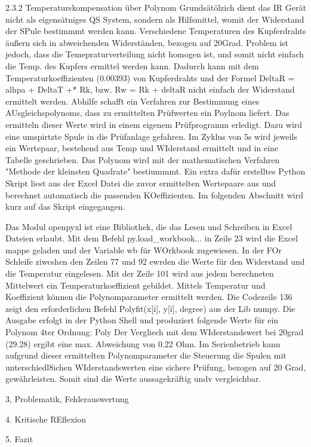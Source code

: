 	2.3.2 Temperaturskompensation über Polynom
		Grundsätölzich dient das IR Gerät nicht als eigensätniges QS System, sondern als 
		Hilfsmittel, womit der Widerstand der SPule bestimmmt werden kann. Verschiedene Temperaturen des Kupferdrahts 
		äußern sich in abweichenden Widerständen, bezogen auf 20Grad. Problem ist jedoch, dass die Temepraturverteilung nicht
		homogen ist, und somit nicht einfach die Temp. des Kupfers ermittel werden kann. Dadurch kann mit dem Temperaturkoeffizienten (0.00393) von Kupferdrahts
		und der Formel DeltaR = alhpa + DeltaT +* Rk, bzw. Rw = Rk + deltaR nicht einfach der Widerstand ermittelt werden. 
		Abhilfe schafft ein Verfahren zur Bestimmung eines AUsgleichspolynoms, dass zu ermittelten Prüfwerten
		ein Poylnom liefert. Das ermitteln dieser Werte wird in einem eigenem Prüfprogramm erledigt. Dazu wird eine umspirtzte Spule in die Prüfanlage gefahren.
		Im Zyklus von 5s wird jeweils ein Wertepaar, bestehend aus Temp und WIderstand ermittelt und in eine Tabelle geschrieben.
		Das Polynom wird mit der mathematischen Verfahren "Methode der kleinsten Quadrate" bestiummmt.
		Ein extra dafür erstelltes Python Skript liest aus der Excel Datei die zuvor ermittelten Wertepaare aus und 
		berechnet automatisch die passenden KOeffizienten. Im folgenden Abschnitt wird kurz auf das Skript eingegangen.
	
		Das Modul openpyxl ist eine Bibliothek, die das Lesen und Schreiben in Excel Dateien erlaubt.
		Mit dem Befehl py.load_workbook... in Zeile 23 wird die Excel mappe geladen und der Variable wb für WOrkbook zugewiesen.
		In der FOr Schleife ziwcshen den Zeilen 77 und 92 ewrden die Werte für den Widerstand und die Temperatur eingelesen. 
		Mit der Zeile 101 wird aus jedem berechneten Mittelwert ein Temperaturkoeffizient gebildet. Mittels Temperatur und Koeffizient können
		die Polynomparameter ermittelt werden. Die Codezeile 136 zeigt den erforderlichen Befehl Polyfit(x[i], y[i], degree) aus der Lib numpy. 
		Die Ausgabe erfolgt in der Python Shell und produziert folgende Werte für ein Polynom 4ter Ordnung:
		\image Poly
		Der Vergliech mit dem WIderstandswert bei 20grad (29.28) ergibt eine max. Abweichung von 0.22 Ohm. 
		Im Serienbetrieb kann aufgrund dieser ermittelten Polynomparameter die Steuerung die Spulen mit unterschiedl8ichen WIderstandswerten 
		eine sichere Prüfung, bezogen auf 20 Grad, gewährleisten. Somit sind die Werte aussagekräftig undv vergleichbar.
	
3, Problematik, Fehlerauswertung


4. Kritische REflexion

5. Fazit